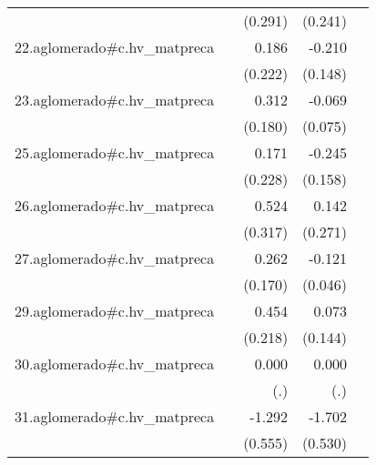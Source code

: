 {\begin{longtable}{l*{4}{D{.}{.}{-1}}}
            &                     &     (0.291)         &     (0.241)         &                     \\
\addlinespace
22.aglomerado#c.hv\_matpreca&                     &       0.186         &      -0.210         &                     \\
            &                     &     (0.222)         &     (0.148)         &                     \\
\addlinespace
23.aglomerado#c.hv\_matpreca&                     &       0.312         &      -0.069         &                     \\
            &                     &     (0.180)         &     (0.075)         &                     \\
\addlinespace
25.aglomerado#c.hv\_matpreca&                     &       0.171         &      -0.245         &                     \\
            &                     &     (0.228)         &     (0.158)         &                     \\
\addlinespace
26.aglomerado#c.hv\_matpreca&                     &       0.524         &       0.142         &                     \\
            &                     &     (0.317)         &     (0.271)         &                     \\
\addlinespace
27.aglomerado#c.hv\_matpreca&                     &       0.262         &      -0.121\sym{**} &                     \\
            &                     &     (0.170)         &     (0.046)         &                     \\
\addlinespace
29.aglomerado#c.hv\_matpreca&                     &       0.454\sym{*}  &       0.073         &                     \\
            &                     &     (0.218)         &     (0.144)         &                     \\
\addlinespace
30.aglomerado#c.hv\_matpreca&                     &       0.000         &       0.000         &                     \\
            &                     &         (.)         &         (.)         &                     \\
\addlinespace
31.aglomerado#c.hv\_matpreca&                     &      -1.292\sym{*}  &      -1.702\sym{**} &                     \\
            &                     &     (0.555)         &     (0.530)         &                     \\

\end{longtable}}

